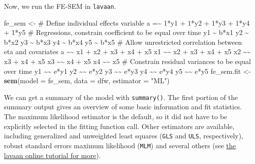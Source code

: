 \documentclass[]{interact}
\theoremstyle{plain}%
\theoremstyle{definition}
\theoremstyle{remark}
\newenvironment{Shaded}{\begin{snugshade}}{\end{snugshade}}
\newcommand{\DataTypeTok}[1]{\textcolor[rgb]{0.13,0.29,0.53}{#1}}
\newcommand{\KeywordTok}[1]{\textcolor[rgb]{0.13,0.29,0.53}{\textbf{#1}}}
\newcommand{\NormalTok}[1]{#1}
\newcommand{\StringTok}[1]{\textcolor[rgb]{0.31,0.60,0.02}{#1}}
\begin{document}
Now, we run the FE-SEM in \texttt{lavaan}.

\singlespacing

\begin{Shaded}
\begin{Highlighting}[]
\NormalTok{fe\_sem \textless{}{-}}\StringTok{ \textquotesingle{}}
\StringTok{\# Define individual effects variable }
\StringTok{a =\textasciitilde{} 1*y1 + 1*y2 + 1*y3 + 1*y4 + 1*y5}
\StringTok{\# Regressions, constrain coefficient to be equal over time}
\StringTok{y1 \textasciitilde{} b*x1}
\StringTok{y2 \textasciitilde{} b*x2 }
\StringTok{y3 \textasciitilde{} b*x3}
\StringTok{y4 \textasciitilde{} b*x4}
\StringTok{y5 \textasciitilde{} b*x5}
\StringTok{\# Allow unrestricted correlation between eta and covariates}
\StringTok{a \textasciitilde{}\textasciitilde{} x1 + x2 + x3 + x4 + x5}
\StringTok{x1 \textasciitilde{}\textasciitilde{} x2 + x3 + x4 + x5}
\StringTok{x2 \textasciitilde{}\textasciitilde{} x3 + x4 + x5}
\StringTok{x3 \textasciitilde{}\textasciitilde{} x4 + x5}
\StringTok{x4 \textasciitilde{}\textasciitilde{} x5}
\StringTok{\# Constrain residual variances to be equal over time}
\StringTok{y1 \textasciitilde{}\textasciitilde{} e*y1}
\StringTok{y2 \textasciitilde{}\textasciitilde{} e*y2}
\StringTok{y3 \textasciitilde{}\textasciitilde{} e*y3}
\StringTok{y4 \textasciitilde{}\textasciitilde{} e*y4}
\StringTok{y5 \textasciitilde{}\textasciitilde{} e*y5}
\StringTok{\textquotesingle{}}
\NormalTok{fe\_sem.fit \textless{}{-}}\StringTok{ }\KeywordTok{sem}\NormalTok{(}\DataTypeTok{model =}\NormalTok{ fe\_sem, }
                  \DataTypeTok{data =}\NormalTok{ dfw, }
                  \DataTypeTok{estimator =} \StringTok{"ML"}\NormalTok{)}
\end{Highlighting}
\end{Shaded}

\doublespacing

\singlespacing

\doublespacing

We can get a summary of the model with \texttt{summary()}. The first
portion of the summary output gives an overview of some basic
information and fit statistics. The maximum likelihood estimator is the
default, so it did not have to be explicitly selected in the fitting
function call. Other estimators are available, including generalized and
unweighted least squares (\texttt{GLS} and \texttt{ULS}, respectively),
robust standard errors maximum likelihood (\texttt{MLM}) and several
others (see \href{https://lavaan.ugent.be/tutorial/est.html}{the lavaan
online tutorial for more}).
\end{document}
